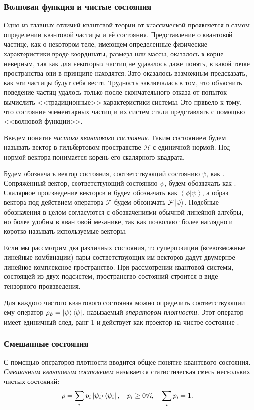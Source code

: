\subsubsection{Волновая функция и чистые состояния}
Одно из главных отличий квантовой теории от классической проявляется в самом определении квантовой частицы и её состояния.
Представление о квантовой частице, как о некотором теле, имеющем определенные физические характеристики вроде координаты, размера или массы, оказалось в корне неверным, так как для некоторых частиц не удавалось даже понять, в какой точке пространства они в принципе находятся. Зато оказалось возможным предсказать, как эти частицы будут себя вести.
Трудность заключалась в том, что объяснить поведение частиц удалось только после окончательного отказа от попыток вычислить <<традиционные>> характеристики системы. Это привело к тому, что состояние элементарных частиц и их систем стали представлять с помощью <<волновой функции>>.

Введем понятие \textit{чистого квантового состояния}. 
Таким состоянием будем называть вектор в гильбертовом пространстве $\mathcal H$ с единичной нормой.
Под нормой вектора понимается корень его скалярного квадрата.

Будем обозначать вектор состояния, соответствующий состоянию $\psi$, как \state{\psi}. 
Сопряжённый вектор, соответствующий состоянию $\psi$, будем обозначать как \conjstate{\psi}. 
Скалярное произведение векторов \state{\psi}  и \conjstate{\phi}  будем обозначать как $\left\langle\phi|\psi\right\rangle$, 
а образ вектора \state{\psi} под действием оператора $\mathcal F$ будем обозначать $\mathcal F\left| \psi \right\rangle$. 
Подобные обозначения в целом согласуются с обозначениями обычной линейной алгебры, но более удобны в квантовой механике, так как позволяют более наглядно и коротко называть используемые векторы.

Если мы рассмотрим два различных состояния, то суперпозиции (всевозможные линейные комбинации) пары соответствующих им векторов дадут двумерное линейное комплексное пространство.
При рассмотрении квантовой системы, состоящей из двух подсистем, пространство состояний строится в виде тензорного произведения. 

Для каждого чистого квантового состояния \state{\psi} можно определить соответствующий ему оператор
$\rho_\psi = \left| \psi \right\rangle \left\langle \psi \right|$, называемый \textit{оператором плотности}.
Этот оператор имеет единичный след, ранг 1 и действует как проектор на чистое состояние \state{\psi}.

\subsubsection{Смешанные состояния}
С помощью операторов плотности вводится общее понятие квантового состояния. \textit{Смешанным квантовым состоянием} называется статистическая смесь нескольких чистых состояний:
\begin{equation}
  \rho = \sum_i p_i \left| \psi_i \right\rangle\left\langle \psi_i \right|, \quad p_i \ge 0 \forall i, \quad \sum_i p_i = 1.
\end{equation}

